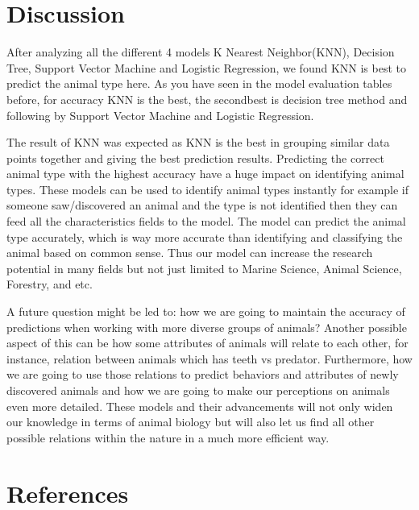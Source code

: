 \documentclass[letterpaper,10pt,english]{jupyterBook}
\begin{document}
\chapter{Discussion}
\label{\detokenize{discussion:discussion}}\label{\detokenize{discussion::doc}}
\sphinxAtStartPar
After analyzing all the different 4 models K Nearest Neighbor(KNN), Decision Tree, Support Vector Machine and Logistic Regression, we found KNN is best to predict the animal type here. As you have seen in the model evaluation tables before, for accuracy KNN is the best, the second\sphinxhyphen{}best is decision tree method and following by Support Vector Machine and Logistic Regression.

\sphinxAtStartPar
The result of KNN was expected as KNN is the best in grouping similar data points together and giving the best prediction results. Predicting the correct animal type with the highest accuracy have a huge impact on identifying animal types. These models can be used to identify animal types instantly for example if someone saw/discovered an animal and the type is not identified then they can feed all the characteristics fields to the model. The model can predict the animal type accurately, which is way more accurate than identifying and classifying the animal based on common sense. Thus our model can increase the research potential in many fields but not just limited to Marine Science, Animal Science, Forestry, and etc.

\sphinxAtStartPar
A future question might be led to: how we are going to maintain the accuracy of predictions when working with more diverse groups of animals? Another possible aspect of this can be how some attributes of animals will relate to each other, for instance, relation between animals which has teeth vs predator. Furthermore, how we are going to use those relations to predict behaviors and attributes of newly discovered animals and how we are going to make our perceptions on animals even more detailed. These models and their advancements will not only widen our knowledge in terms of animal biology but will also let us find all other possible relations within the nature in a much more efficient way.

\sphinxstepscope


\chapter{References}
\label{\detokenize{references:references}}\label{\detokenize{references::doc}}
\sphinxAtStartPar
\end{document}
